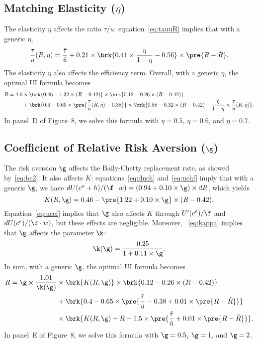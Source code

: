 \documentclass[letterpaper,12pt,leqno]{article}
\begin{document}
\subsection{Matching Elasticity ($\eta$)}

The elasticity $\eta$ affects the ratio $\tau/u$: equation~\eqref{eq:tauuR} implies that with a generic $\eta$,
\begin{equation*}
\frac{\tau}{u}(R,\eta)  =\frac{\hat{\tau}}{\hat{u}} + 0.21 \times \brk{0.41\times \frac{\eta}{1-\eta} - 0.56}\times \pre{R-\hat{R}}.
\end{equation*}
The elasticity $\eta$ also affects the efficiency term. Overall, with a generic $\eta$, the optimal UI formula becomes
\begin{align*}
R = 4.6  & \times \brk{0.46-1.32\times (R-0.42)} \times \brk{0.12-0.26\times (R-0.42)}\\
&+\brk{0.4 - 0.65 \times \pre{\frac{\tau}{u}(R,\eta)-0.38}}\times\brk{0.88 - 0.32\times (R-0.42) - \frac{\eta}{1-\eta} \times \frac{\tau}{u}(R,\eta)}.
\end{align*}
In panel~D of Figure~8, we solve this formula with $\eta=0.5$, $\eta=0.6$, and $\eta=0.7$.


\subsection{Coefficient of Relative Risk Aversion ($\g$)}

The risk aversion $\g$ affects the Baily-Chetty replacement rate, as showed by~\eqref{eq:bc2}. It also affects $K$: equations~\eqref{eq:duch} and~\eqref{eq:uchf} imply that with a generic $\g$, we have $dU(c^{u}+h)/(\f\cdot w) = (0.94+ 0.10\times \g)\times dR$, which yields
\begin{equation*}
K(R,\g)=0.46-\pre{1.22+0.10\times \g}\times (R-0.42).
\end{equation*} 
Equation~\eqref{eq:ucef} implies that $\g$ also  affects $K$ through $U'(c^{e})/\f$ and $dU(c^e)/(\f\cdot w)$, but these effects are negligible. Moreover, ~\eqref{eq:kappa} implies that $\g$ affects the parameter $\k$:
\begin{equation*}
\k(\g)=\frac{0.25}{1+0.11\times \g}.
\end{equation*} 
In sum, with a generic $\g$, the optimal UI formula becomes
\begin{align*}
R = \g\times \frac{1.01}{\k(\g)}  & \times \brk{K(R,\g)} \times \brk{0.12-0.26\times (R-0.42)}\\
&+\brk{0.4 - 0.65 \times \pre{\frac{\hat{\tau}}{\hat{u}}-0.38+ 0.01 \times \pre{R-\hat{R}}}}\\
&\times\brk{K(R,\g)+ R - 1.5 \times \pre{\frac{\hat{\tau}}{\hat{u}}+ 0.01 \times \pre{R-\hat{R}}}}.
\end{align*}
In panel~E of Figure~8, we solve this formula with $\g=0.5$, $\g=1$, and $\g=2$.
\end{document}
